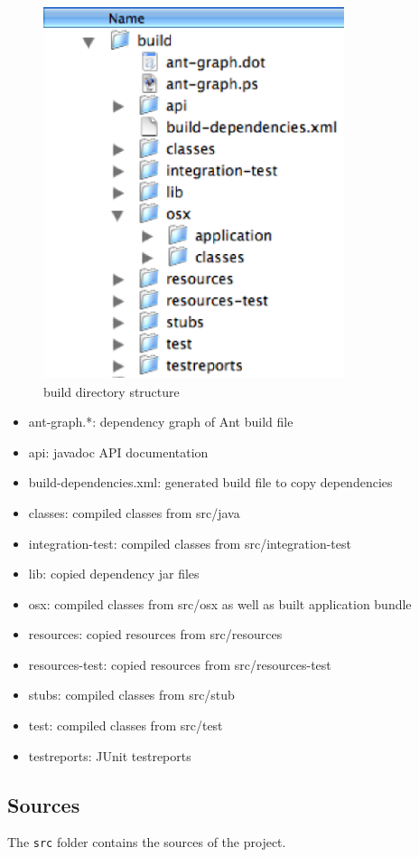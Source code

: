 \documentclass[11pt,a4paper]{article}
\begin{document}
\begin{figure}[H]
 \centering
 \includegraphics[width=8.8cm,height=10.9cm]{../images/developersguide/dir-build.eps}
 \caption{build directory structure}
\end{figure}

\begin{itemize}
 \item ant-graph.*: dependency graph of Ant build file
 \item api: javadoc API documentation
 \item build-dependencies.xml: generated build file to copy dependencies
 \item classes: compiled classes from src/java
 \item integration-test: compiled classes from src/integration-test
 \item lib: copied dependency jar files
 \item osx: compiled classes from src/osx as well as built application bundle
 \item resources: copied resources from src/resources
 \item resources-test: copied resources from src/resources-test
 \item stubs: compiled classes from src/stub
 \item test: compiled classes from src/test
 \item testreports: JUnit testreports
\end{itemize}

\subsection{Sources}
The \texttt{src} folder contains the sources of the project.
\end{document}
